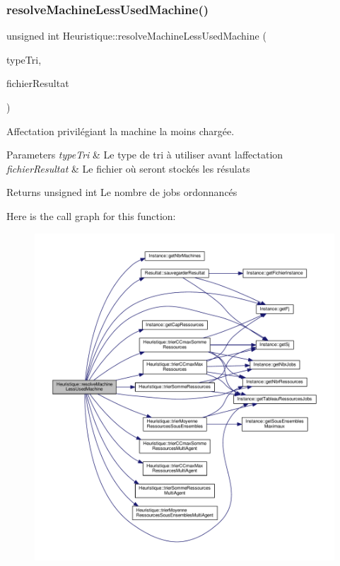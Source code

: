 \subsubsection{\texorpdfstring{resolve\+Machine\+Less\+Used\+Machine()}{resolveMachineLessUsedMachine()}}
{\footnotesize\ttfamily unsigned int Heuristique\+::resolve\+Machine\+Less\+Used\+Machine (\begin{DoxyParamCaption}\item[{Q\+String}]{type\+Tri,  }\item[{Q\+String}]{fichier\+Resultat }\end{DoxyParamCaption})}



Affectation privilégiant la machine la moins chargée. 


\begin{DoxyParams}{Parameters}
{\em type\+Tri} & Le type de tri à utiliser avant l\textquotesingle{}affectation \\
\hline
{\em fichier\+Resultat} & Le fichier où seront stockés les résulats \\
\hline
\end{DoxyParams}
\begin{DoxyReturn}{Returns}
unsigned int Le nombre de jobs ordonnancés 
\end{DoxyReturn}
Here is the call graph for this function\+:
\nopagebreak
\begin{figure}[H]
\begin{center}
\leavevmode
\includegraphics[width=350pt]{classHeuristique_aee20a4baec95a33533a6e13029c437df_cgraph}
\end{center}
\end{figure}
\mbox{\label{classHeuristique_ad8a57ed34b0c46f6d65e501ee99da498}} 
